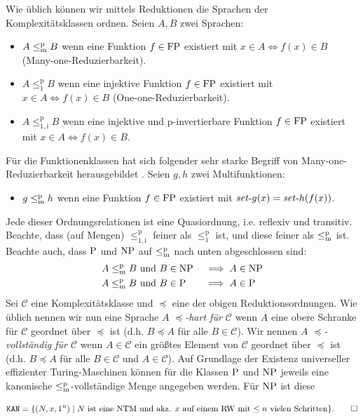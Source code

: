 Wie üblich können wir mittels Reduktionen die Sprachen der Komplexitätsklassen ordnen. Seien $A,B$ zwei Sprachen:
\begin{itemize}
    \item $A\leqmp B$ wenn eine Funktion $f\in\FP$ existiert mit $x\in A\iff f(x)\in B$ (Many-one-Reduzierbarkeit).
    \item $A\leq_1^\mathrm{p} B$ wenn eine injektive Funktion $f\in\FP$ existiert mit $x\in A\iff f(x)\in B$ (One-one-Reduzierbarkeit).
    \item $A\leq_\mathrm{1,i}^\mathrm{p} B$ wenn eine injektive und p-invertierbare Funktion $f\in\FP$ existiert mit $x\in A\iff f(x)\in B$.
\end{itemize}
Für die Funktionenklassen hat sich folgender sehr starke Begriff von Many-one-Reduzierbarkeit herausgebildet \parencites{kobler_is_2000}{beyersdorff_nondeterministic_2009}{pudlak_incompleteness_2017}. Seien $g,h$ zwei Multifunktionen:
\begin{itemize}
    \item $g\leqmp h$ wenn eine Funktion $f\in\FP$ existiert mit $\fset{}g(x)=\fset{}h(f(x))$.
\end{itemize}
Jede dieser Ordnungsrelationen ist eine Quasiordnung, i.e. reflexiv und transitiv.
Beachte, dass (auf Mengen) $\leq_\mathrm{1,i}^\mathrm{p}$ feiner als $\leq_1^\mathrm{p}$ ist, und diese feiner als $\leqmp$ ist.
Beachte auch, dass $\P$ und $\NP$ auf $\leqmp$ nach unten abgeschlossen sind:
\begin{alignat*}{2}
    &A\leqmp B \text{ und } B\in\NP &&\implies A\in\NP\\
    &A\leqmp B \text{ und } B\in\P &&\implies A\in\P
\end{alignat*}
Sei $\mathcal C$ eine Komplexitätsklasse und $\preceq$ eine der obigen Reduktionsordnungen.
Wie üblich nennen wir nun eine Sprache $A$ \emph{$\preceq$-hart für $\mathcal C$} wenn $A$ eine obere Schranke für $\mathcal C$ geordnet über $\preceq$  ist (d.h. $B\preceq A$ für alle $B\in\mathcal C$).
Wir nennen $A$ \emph{$\preceq$-vollständig für $\mathcal C$} wenn $A\in\mathcal C$ ein größtes Element von $\mathcal C$ geordnet über $\preceq$ ist (d.h. $B\preceq A$ für alle $B\in\mathcal C$ und $A\in\mathcal C$).
Auf Grundlage der Existenz universeller effizienter Turing-Maschinen können für die Klassen $\P$ und $\NP$ jeweils eine kanonische $\leqmp$-vollständige Menge angegeben werden. Für $\NP$ ist diese
\begin{definition}
\[ \mathtt{KAN} = \{ (N, x, 1^n) \mid \text{$N$ ist eine NTM und akz. $x$ auf einem RW mit $\leq n$ vielen Schritten} \}.\qedhere \]
\end{definition}
